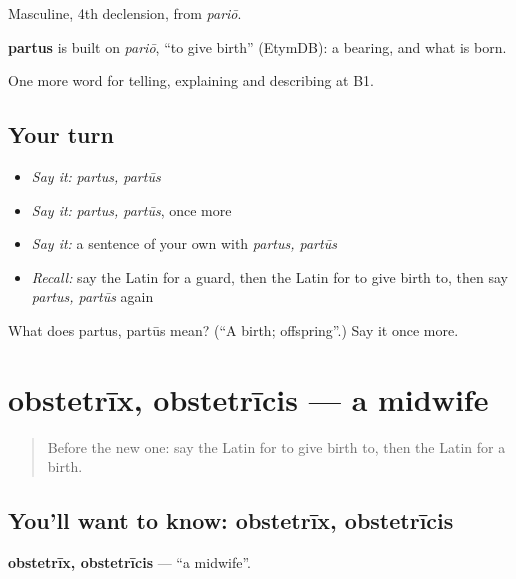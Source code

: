 Masculine, 4th declension, from \emph{pariō}.

\begin{cousinweb}
\textbf{partus} is built on \emph{pariō}, \textquotedblleft{}to give birth\textquotedblright{} (EtymDB): a bearing, and what is born.
\end{cousinweb}

\begin{grammarlens}[title={What you've built}]
One more word for telling, explaining and describing at B1.
\end{grammarlens}

\subsection*{Your turn}
\begin{itemize}
\raggedright
  \item \emph{Say it:} \emph{partus, partūs}
  \item \emph{Say it:} \emph{partus, partūs}, once more
  \item \emph{Say it:} a sentence of your own with \emph{partus, partūs}
  \item \emph{Recall:} say the Latin for a guard, then the Latin for to give birth to, then say \emph{partus, partūs} again
\end{itemize}

\begin{tcolorbox}[breakable,colback=teal!4,colframe=teal!35!black,title={Before you move on}]
What does partus, partūs mean? (\textquotedblleft{}A birth; offspring\textquotedblright{}.) Say it once more.
\end{tcolorbox}
\section[obstetrīx, obstetrīcis]{obstetrīx, obstetrīcis — a midwife}

\label{lesson:LA-C323-obstetrix}



\begin{quote}
Before the new one: say the Latin for to give birth to, then the Latin for a birth.
\end{quote}

\subsection*{You'll want to know: obstetrīx, obstetrīcis}
\textbf{obstetrīx, obstetrīcis} — \textquotedblleft{}a midwife\textquotedblright{}.

